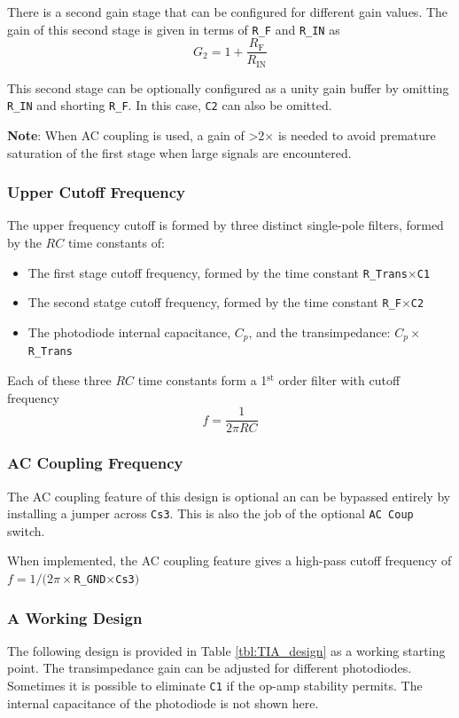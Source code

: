 \documentclass[8pt,a4paper]{article}
\begin{document}
	There is a second gain stage that can be configured for different gain values. The gain of this second stage is given in terms of \verb|R_F| and \verb|R_IN| as
	\begin{equation*}
		G_2 = 1 + \frac{R_\mathrm{F}}{R_\mathrm{IN}}
	\end{equation*}
	
	This second stage can be optionally configured as a unity gain buffer by omitting \verb|R_IN| and shorting \verb|R_F|. In this case, \verb|C2| can also be omitted.
	
	\textbf{Note}: When AC coupling is used, a gain of \textgreater 2$\times$ is needed to avoid premature saturation of the first stage when large signals are encountered.
	
	\subsubsection*{Upper Cutoff Frequency}
	The upper frequency cutoff is formed by three distinct single-pole filters, formed by the $RC$ time constants of:
	\begin{itemize}
		\item The first stage cutoff frequency, formed by the time constant \verb|R_Trans|$\times$\verb|C1|
		\item The second statge cutoff frequency, formed by the time constant \verb|R_F|$\times$\verb|C2|
		\item The photodiode internal capacitance, $C_p$, and the transimpedance: $C_p \times$ \verb|R_Trans|
	\end{itemize}
	Each of these three $RC$ time constants form a 1$^\mathrm{st}$ order filter with cutoff frequency
	\begin{equation*}
		f = \frac{1}{2\pi R C}
	\end{equation*}
	
	\subsubsection*{AC Coupling Frequency}
	The AC coupling feature of this design is optional an can be bypassed entirely by installing a jumper across \verb|Cs3|. This is also the job of the optional \verb|AC Coup| switch.
	
	When implemented, the AC coupling feature gives a high-pass cutoff frequency of $f = 1/(2\pi\times$\verb|R_GND|$\times$\verb|Cs3|$)$
	
	\subsubsection*{A Working Design}
	The following design is provided in Table \ref{tbl:TIA_design} as a working starting point. The transimpedance gain can be adjusted for different photodiodes. Sometimes it is possible to eliminate \verb|C1| if the op-amp stability permits. The internal capacitance of the photodiode is not shown here.
	
\end{document}
